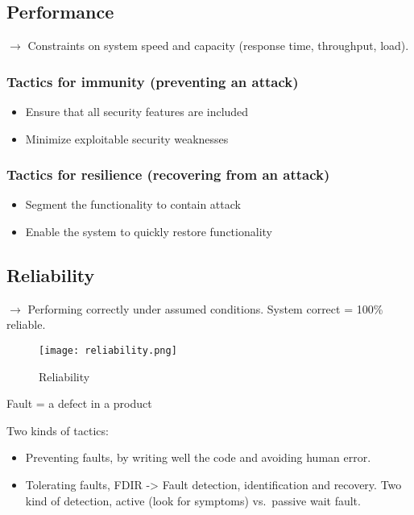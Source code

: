 \subsection{Performance}

$\rightarrow$ Constraints on system speed and capacity (response time, throughput, load).

\subsubsection{Tactics for immunity (preventing an attack)}

\begin{itemize}
    \item Ensure that all security features are included
    \item Minimize exploitable security weaknesses
\end{itemize}

\subsubsection{Tactics for resilience (recovering from an attack)}

\begin{itemize}
    \item Segment the functionality to contain attack
    \item Enable the system to quickly restore functionality
\end{itemize}

\subsection{Reliability}

$\rightarrow$ Performing correctly under assumed conditions. System correct = 100\% reliable.

\begin{figure}[!ht]
    \centering
    \texttt{[image: reliability.png]}
    \caption{Reliability}
\end{figure}

Fault = a defect in a product

Two kinds of tactics:

\begin{itemize}
    \item Preventing faults, by writing well the code and avoiding human error.
    \item Tolerating faults, FDIR -> Fault detection, identification and recovery. Two kind of detection, active (look for symptoms) vs.\ passive wait fault.
\end{itemize}

